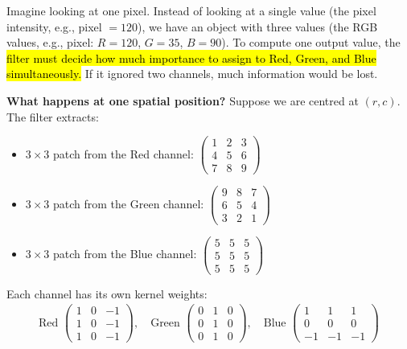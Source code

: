 \highspace
Imagine looking at one pixel. Instead of looking at a single value (the pixel intensity, e.g., pixel $= 120$), we have an object with three values (the RGB values, e.g., pixel: $R = 120$, $G = 35$, $B = 90$). To compute one output value, the \hl{filter must decide how much importance to assign to Red, Green, and Blue simultaneously.} If it ignored two channels, much information would be lost.

\highspace
\textcolor{Green3}{ \textbf{What happens at one spatial position?}} Suppose we are centred at $(r,c)$. The filter extracts:
\begin{itemize}
    \item $3 \times 3$ patch from the Red channel: $\begin{pmatrix}
        1 & 2 & 3 \\
        4 & 5 & 6 \\
        7 & 8 & 9
    \end{pmatrix}$
    \item $3 \times 3$ patch from the Green channel: $\begin{pmatrix}
        9 & 8 & 7 \\
        6 & 5 & 4 \\
        3 & 2 & 1
    \end{pmatrix}$
    \item $3 \times 3$ patch from the Blue channel: $\begin{pmatrix}
        5 & 5 & 5 \\
        5 & 5 & 5 \\
        5 & 5 & 5
    \end{pmatrix}$
\end{itemize}
Each channel has its own kernel weights:
\begin{gather*}
    \text{Red } \begin{pmatrix}
        1 & 0 & -1 \\
        1 & 0 & -1 \\
        1 & 0 & -1
    \end{pmatrix}, \quad
    \text{Green } \begin{pmatrix}
        0 & 1 & 0 \\
        0 & 1 & 0 \\
        0 & 1 & 0
    \end{pmatrix}, \quad
    \text{Blue } \begin{pmatrix}
        1 & 1 & 1 \\
        0 & 0 & 0 \\
        -1 & -1 & -1
    \end{pmatrix}
\end{gather*}
